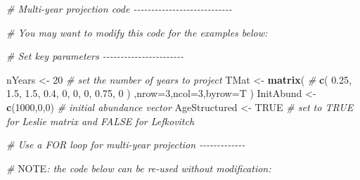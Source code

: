 \documentclass[
]{article}
\newenvironment{Shaded}{\begin{snugshade}}{\end{snugshade}}
\newcommand{\AlertTok}[1]{\textcolor[rgb]{0.94,0.16,0.16}{#1}}
\newcommand{\AttributeTok}[1]{\textcolor[rgb]{0.13,0.29,0.53}{#1}}
\newcommand{\CommentTok}[1]{\textcolor[rgb]{0.56,0.35,0.01}{\textit{#1}}}
\newcommand{\ConstantTok}[1]{\textcolor[rgb]{0.56,0.35,0.01}{#1}}
\newcommand{\DecValTok}[1]{\textcolor[rgb]{0.00,0.00,0.81}{#1}}
\newcommand{\FloatTok}[1]{\textcolor[rgb]{0.00,0.00,0.81}{#1}}
\newcommand{\FunctionTok}[1]{\textcolor[rgb]{0.13,0.29,0.53}{\textbf{#1}}}
\newcommand{\NormalTok}[1]{#1}
\newcommand{\OtherTok}[1]{\textcolor[rgb]{0.56,0.35,0.01}{#1}}
\begin{document}
\begin{Shaded}
\begin{Highlighting}[]
\CommentTok{\# Multi{-}year projection code {-}{-}{-}{-}{-}{-}{-}{-}{-}{-}{-}{-}{-}{-}{-}{-}{-}{-}{-}{-}{-}{-}{-}{-}{-}{-}{-}{-}}

\CommentTok{\#  You may want to modify this code for the examples below:}


\CommentTok{\# Set key parameters {-}{-}{-}{-}{-}{-}{-}{-}{-}{-}{-}{-}{-}{-}{-}{-}{-}{-}{-}{-}{-}{-}{-}}

\NormalTok{nYears }\OtherTok{\textless{}{-}} \DecValTok{20}                                            \CommentTok{\# set the number of years to project}
\NormalTok{TMat }\OtherTok{\textless{}{-}} \FunctionTok{matrix}\NormalTok{(     }\CommentTok{\# }
  \FunctionTok{c}\NormalTok{(}
    \FloatTok{0.25}\NormalTok{,     }\FloatTok{1.5}\NormalTok{,   }\FloatTok{1.5}\NormalTok{,}
    \FloatTok{0.4}\NormalTok{,   }\DecValTok{0}\NormalTok{,     }\DecValTok{0}\NormalTok{,}
    \DecValTok{0}\NormalTok{,     }\FloatTok{0.75}\NormalTok{,   }\DecValTok{0}
\NormalTok{  )}
\NormalTok{  ,}\AttributeTok{nrow=}\DecValTok{3}\NormalTok{,}\AttributeTok{ncol=}\DecValTok{3}\NormalTok{,}\AttributeTok{byrow=}\NormalTok{T}
\NormalTok{)}
\NormalTok{InitAbund }\OtherTok{\textless{}{-}} \FunctionTok{c}\NormalTok{(}\DecValTok{1000}\NormalTok{,}\DecValTok{0}\NormalTok{,}\DecValTok{0}\NormalTok{)                                }\CommentTok{\# initial abundance vector}
\NormalTok{AgeStructured }\OtherTok{\textless{}{-}} \ConstantTok{TRUE}          \CommentTok{\# set to TRUE for Leslie matrix and FALSE for Lefkovitch }


\CommentTok{\# Use a FOR loop for multi{-}year projection  {-}{-}{-}{-}{-}{-}{-}{-}{-}{-}{-}{-}{-}}

   \CommentTok{\# }\AlertTok{NOTE}\CommentTok{: the code below can be re{-}used without modification:}


\end{Highlighting}
\end{Shaded}
\end{document}
